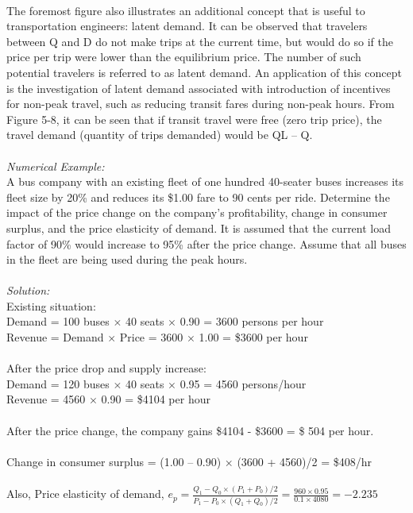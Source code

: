 \paragraph{}
The foremost figure also illustrates an additional concept that is useful to transportation engineers: latent demand. It can be observed that travelers between Q and D do not make trips at the current time, but would do so if the price per trip were lower than the equilibrium price. The number of such potential travelers is referred to as latent demand. An application of this concept is the investigation of latent demand associated with introduction of incentives for non-peak travel, such as reducing transit fares during non-peak hours. From Figure 5-8, it can be seen that if transit travel were free (zero trip price), the travel demand (quantity of trips demanded) would be QL – Q.\\\\
\textit{Numerical Example:}\\
A bus company with an existing fleet of one hundred 40-seater buses increases its fleet size by 20\% and reduces its \$1.00 fare to 90 cents per ride. Determine the impact of the price change on the company’s profitability, change in consumer surplus, and the price elasticity of demand. It is assumed that the current load factor of 90\% would increase to 95\% after the price change. Assume that all buses in the fleet are being used during the peak hours.\\\\
\textit{Solution:}\\
Existing situation:\\
\hspace*{10mm}Demand = 100 buses $ \times $ 40 seats $ \times $ 0.90 = 3600 persons per hour\\
\hspace*{10mm}Revenue = Demand $ \times $ Price = 3600 $ \times $ 1.00 = \$3600 per hour\\\\
After the price drop and supply increase:\\
\hspace*{10mm}Demand = 120 buses $ \times $ 40 seats $ \times $ 0.95 = 4560 persons/hour\\
\hspace*{10mm}Revenue = 4560 $ \times $ 0.90 = \$4104 per hour\\\\
After the price change, the company gains \$4104 - \$3600 = \$ 504 per hour.\\\\
Change in consumer surplus = (1.00 – 0.90) × (3600 + 4560)/2 = \$408/hr\\\\
Also, Price elasticity of demand,
$ e_p = \frac{Q_1 - Q_0 \times (P_1 + P_0)/2}{P_1 - P_0 \times (Q_1 + Q_0)/2} = \frac{960 \times 0.95}{0.1 \times 4080} = -2.235$
%
